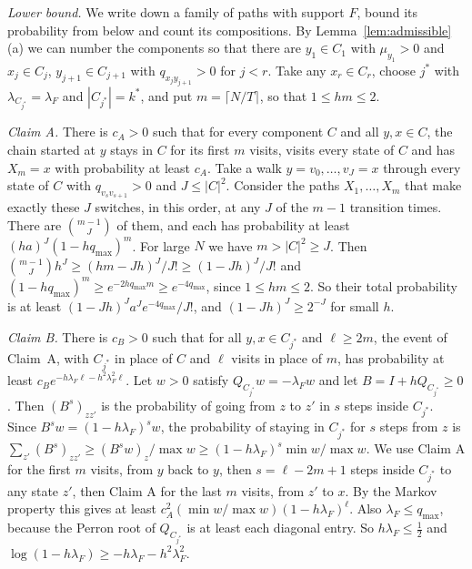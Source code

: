 \emph{Lower bound.} We write down a family of paths with support $F$, bound
its probability from below and count its compositions. By
Lemma~\ref{lem:admissible}(a) we can number the components so that there are
$y_1\in C_1$ with $\mu_{y_1}>0$ and $x_j\in C_j$, $y_{j+1}\in C_{j+1}$ with
$q_{x_jy_{j+1}}>0$ for $j<r$. Take any $x_r\in C_r$, choose $j^*$ with
$\lambda_{C_{j^*}}=\lambda_F$ and $|C_{j^*}|=k^*$, and put
$m=\lceil N/T\rceil$, so that $1\le hm\le2$.

\emph{Claim A.} There is $c_A>0$ such that for every component $C$ and all
$y,x\in C$, the chain started at $y$ stays in $C$ for its first $m$ visits,
visits every state of $C$ and has $X_m=x$ with probability at least $c_A$.
Take a walk $y=v_0,\dots,v_J=x$ through every state of $C$ with
$q_{v_sv_{s+1}}>0$ and $J\le|C|^2$. Consider the paths $X_1,\dots,X_m$ that
make exactly these $J$ switches, in this order, at any $J$ of the $m-1$
transition times. There are $\binom{m-1}J$ of them, and each has probability
at least $(ha)^J(1-hq_{\max})^m$. For large $N$ we have $m>|C|^2\ge J$. Then
$\binom{m-1}Jh^J\ge(hm-Jh)^J/J!\ge(1-Jh)^J/J!$ and
$(1-hq_{\max})^m\ge e^{-2hq_{\max}m}\ge e^{-4q_{\max}}$, since
$1\le hm\le2$. So their total probability is at least
$(1-Jh)^Ja^Je^{-4q_{\max}}/J!$, and $(1-Jh)^J\ge2^{-J}$ for small $h$.

\emph{Claim B.} There is $c_B>0$ such that for all $y,x\in C_{j^*}$ and
$\ell\ge2m$, the event of Claim~A, with $C_{j^*}$ in place of $C$ and $\ell$
visits in place of $m$, has probability at least $c_Be^{-h\lambda_F\ell-h^2\lambda_F^2\ell}$. Let $w>0$
satisfy $Q_{C_{j^*}}w=-\lambda_Fw$ and let $B=I+hQ_{C_{j^*}}\ge0$. Then
$(B^s)_{zz'}$ is the probability of going from $z$ to $z'$ in $s$ steps
inside $C_{j^*}$. Since $B^sw=(1-h\lambda_F)^sw$, the probability of staying
in $C_{j^*}$ for $s$ steps from $z$ is
$\sum_{z'}(B^s)_{zz'}\ge(B^sw)_z/\max w\ge(1-h\lambda_F)^s\min w/\max w$. We
use Claim A for the first $m$ visits, from $y$ back to $y$, then
$s=\ell-2m+1$ steps inside $C_{j^*}$ to any state $z'$, then Claim A for the
last $m$ visits, from $z'$ to $x$. By the Markov property this gives at least
$c_A^2(\min w/\max w)(1-h\lambda_F)^\ell$. Also $\lambda_F\le q_{\max}$,
because the Perron root of $Q_{C_{j^*}}$ is at least each diagonal entry. So
$h\lambda_F\le\frac12$ and $\log(1-h\lambda_F)\ge-h\lambda_F-h^2\lambda_F^2$.

